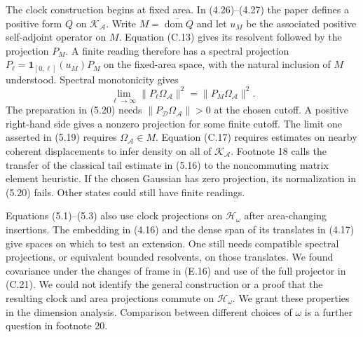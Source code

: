 \documentclass[11pt]{article}
\begin{document}
The clock construction begins at fixed area. In (4.26)--(4.27) the paper defines a positive form $Q$ on $\mathcal K_{\mathcal A}$. Write $M=\overline{\operatorname{dom}Q}$ and let $u_M$ be the associated positive self-adjoint operator on $M$. Equation (C.13) gives its resolvent followed by the projection $P_M$. A finite reading therefore has a spectral projection $P_\ell=\mathbf 1_{[0,\ell]}(u_M)P_M$ on the fixed-area space, with the natural inclusion of $M$ understood. Spectral monotonicity gives
\[
 \lim_{\ell\to\infty}\|P_\ell\Omega_{\mathcal A}\|^2
      =\|P_M\Omega_{\mathcal A}\|^2 .
\]
The preparation in (5.20) needs $\|P_{\mathcal D}\Omega_{\mathcal A}\|>0$ at the chosen cutoff. A positive right-hand side gives a nonzero projection for some finite cutoff. The limit one asserted in (5.19) requires $\Omega_{\mathcal A}\in M$. Equation (C.17) requires estimates on nearby coherent displacements to infer density on all of $\mathcal K_{\mathcal A}$. Footnote 18 calls the transfer of the classical tail estimate in (5.16) to the noncommuting matrix element heuristic. If the chosen Gaussian has zero projection, its normalization in (5.20) fails. Other states could still have finite readings.

Equations (5.1)--(5.3) also use clock projections on $\mathcal H_\omega$ after area-changing insertions. The embedding in (4.16) and the dense span of its translates in (4.17) give spaces on which to test an extension. One still needs compatible spectral projections, or equivalent bounded resolvents, on those translates. We found covariance under the changes of frame in (E.16) and use of the full projector in (C.21). We could not identify the general construction or a proof that the resulting clock and area projections commute on $\mathcal H_\omega$. We grant these properties in the dimension analysis. Comparison between different choices of $\omega$ is a further question in footnote 20.
\end{document}
